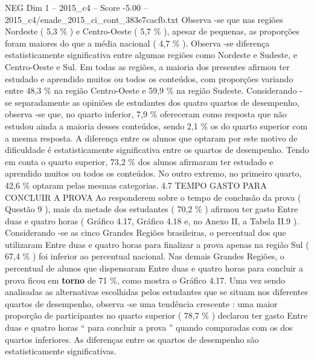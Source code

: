 \begin{textsample}{NEG Dim 1 – 2015\_c4 – Score -5.00 – 2015\_c4/enade\_2015\_ci\_cont\_383e7cacfb.txt}
Observa -se que nas regiões Nordeste ( 5,3 \% ) e Centro-Oeste ( 5,7 \% ), apesar de pequenas, as proporções foram maiores do que a média nacional ( 4,7 \% ).
Observa -se diferença estatisticamente significativa entre algumas regiões como Nordeste e Sudeste, e Centro-Oeste e Sul.
Em todas as regiões, a maioria dos presentes afirmou ter estudado e aprendido muitos ou todos os conteúdos, com proporções variando entre 48,3 \% na região Centro-Oeste e 59,9 \% na região Sudeste.
Considerando -se separadamente as opiniões de estudantes dos quatro quartos de desempenho, observa -se que, no quarto inferior, 7,9 \% ofereceram como resposta que não estudou ainda a maioria desses conteúdos, sendo 2,1 \% os do quarto superior com a mesma resposta.
A diferença entre os alunos que optaram por este motivo de dificuldade é estatisticamente significativa entre os quartos de desempenho.
Tendo em conta o quarto superior, 73,2 \% dos alunos afirmaram ter estudado e aprendido muitos ou todos os conteúdos.
No outro extremo, no primeiro quarto, 42,6 \% optaram pelas mesmas categorias. 4.7 TEMPO GASTO PARA CONCLUIR A PROVA Ao responderem sobre o tempo de conclusão da prova ( Questão 9 ), mais da metade dos estudantes ( 70,2 \% ) afirmou ter gasto Entre duas e quatro horas ( Gráfico 4.17, Gráfico 4.18 e, no Anexo II, a Tabela II.9 ).
Considerando -se as cinco Grandes Regiões brasileiras, o percentual dos que utilizaram Entre duas e quatro horas para finalizar a prova apenas na região Sul ( 67,4 \% ) foi inferior ao percentual nacional.
Nas demais Grandes Regiões, o percentual de alunos que dispensaram Entre duas e quatro horas para concluir a prova ficou em \textbf{torno} de 71 \%, como mostra o Gráfico 4.17.
Uma vez sendo analisadas as alternativas escolhidas pelos estudantes que se situam nos diferentes quartos de desempenho, observa -se uma tendência crescente : uma maior proporção de participantes no quarto superior ( 78,7 \% ) declarou ter gasto Entre duas e quatro horas “ para concluir a prova ” quando comparadas com os dos quartos inferiores.
As diferenças entre os quartos de desempenho são estatisticamente significativas.

\end{textsample}
